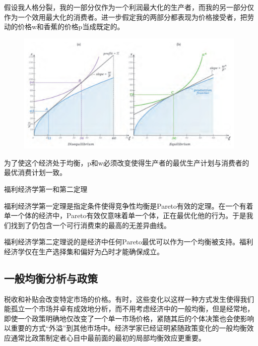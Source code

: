 \documentclass{article}
\begin{document}
假设我人格分裂，我的一部分仅作为一个利润最大化的生产者，而我的另一部分仅作为一个效用最大化的消费者。进一步假定我的两部分都表现为价格接受者，把劳动的价格w和香蕉的价格p当成既定的。

\begin{figure}[H] %
	\centering %
	\includegraphics[width=1\textwidth]{16_5} %
	\caption{} %
	\label{Fig.main6} %
\end{figure}


为了使这个经济处于均衡，p和w必须改变使得生产者的最优生产计划与消费者的最优消费计划一致。

\hspace*{\fill}

福利经济学第一和第二定理

福利经济学第一定理是指定条件使得竞争性均衡是Pareto有效的定理。在一个有着单一个体的经济中，Pareto有效仅意味着单一个体，正在最优化他的行为。于是我们找到了仍包含一个可行消费束的最高的无差异曲线。

福利经济学第二定理说的是经济中任何Pareto最优可以作为一个均衡被支持。福利经济学仅在生产选择集和偏好为凸时才能确保成立。

\subsection{一般均衡分析与政策}

税收和补贴会改变特定市场的价格。有时，这些变化以这样一种方式发生使得我们能孤立一个市场并卓有成效地分析，而不用考虑经济中的一般均衡，但是经常地，即使一个政策明确地仅改变了一个单一市场价格，紧随其后的个体决策也会使影响以重要的方式“外溢”到其他市场中。经济学家已经证明紧随政策变化的一般均衡效应通常比政策制定者心目中最前面的最初的局部均衡效应更重要。
\end{document}
